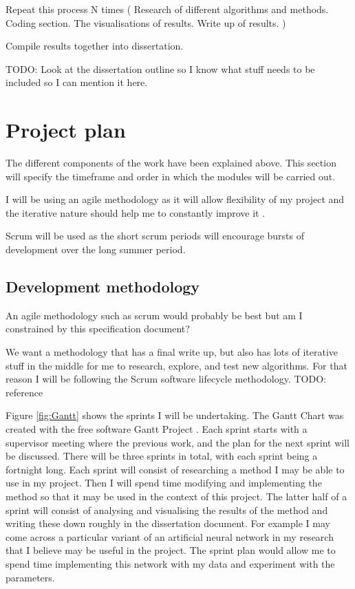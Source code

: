 \documentclass{article}
\begin{document}
Repeat this process N times
(
Research of different algorithms and methods.
Coding section.
The visualisations of results.
Write up of results.
)

Compile results together into dissertation.

TODO: Look at the dissertation outline so I know what stuff needs to be included so I can mention it here.

\section{Project plan}
% 

The different components of the work have been explained above.
This section will specify the timeframe and order in which the modules will be carried out.

I will be using an agile methodology as it will allow flexibility of my project and the iterative nature should help me to constantly improve it \cite{beck2001manifesto}. 

Scrum will be used as the short scrum periods will encourage bursts of development over the long summer period.

\subsection{Development methodology}
An agile methodology such as scrum would probably be best but am I constrained  by this specification document?

We want a methodology that has a final write up, but also has lots of iterative stuff in the middle for me to research, explore, and test new algorithms.
For that reason I will be following the Scrum software lifecycle methodology.
TODO: reference 

Figure \ref{fig:Gantt} shows the sprints I will be undertaking.
The Gantt Chart was created with the free software Gantt Project \cite{GanttProject}.
Each sprint starts with a supervisor meeting where the previous work, and the plan for the next sprint will be discussed.
There will be three sprints in total, with each sprint being a fortnight long.
Each sprint will consist of researching a method I may be able to use in my project.
Then I will spend time modifying and implementing the method so that it may be used in the context of this project.
The latter half of a sprint will consist of analysing and visualising the results of the method and writing these down roughly in the dissertation document.
For example I may come across a particular variant of an artificial neural network in my research that I believe may be useful in the project.
The sprint plan would allow me to spend time implementing this network with my data and experiment with the parameters.  
\end{document}
